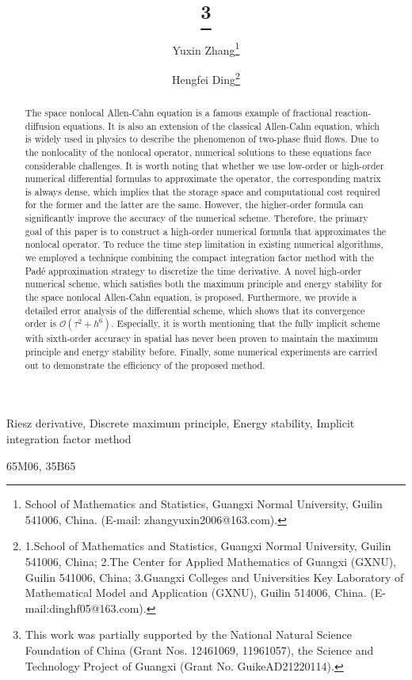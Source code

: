 \documentclass{siamart171218}
\title{{\TheTitle}\thanks{This work was partially supported by the
 National Natural Science Foundation of China
 (Grant Nos. 12461069, 11961057), the Science and
Technology Project of Guangxi (Grant No. GuikeAD21220114).}}
\author{
Yuxin Zhang\thanks{School of Mathematics and Statistics,
Guangxi Normal University, Guilin 541006, China. (E-mail: zhangyuxin2006@163.com).}
\and
Hengfei Ding\thanks{1.School of Mathematics and Statistics, Guangxi Normal University, Guilin 541006, China;
2.The Center for Applied
Mathematics of Guangxi (GXNU), Guilin 541006, China;
3.Guangxi Colleges and Universities Key Laboratory of Mathematical Model and Application (GXNU),
 Guilin 514006, China. (E-mail:dinghf05@163.com).}}
\numberwithin{theorem}{section}
\numberwithin{equation}{section}
\begin{document}
\maketitle
\begin{abstract}
 The space nonlocal Allen-Cahn equation is a famous example of fractional reaction-diffusion equations. It is also an extension of the classical Allen-Cahn equation, which is widely used in physics to describe the phenomenon of two-phase fluid flows.
 Due to the nonlocality of the nonlocal operator, numerical solutions to
 these equations face considerable challenges.
 It is worth noting that whether we use low-order or
 high-order numerical differential
  formulas to approximate the operator, the corresponding matrix is always
  dense, which implies that the storage space and computational cost
  required for the former and the latter are the same.
 However, the higher-order formula can significantly
  improve the accuracy of the numerical scheme.
   Therefore, the primary goal of this paper is to construct a high-order numerical formula that approximates the nonlocal operator.
  To reduce the time step limitation in existing numerical algorithms, we employed a technique combining the compact integration factor method with the Pad\'{e} approximation strategy to discretize the time derivative.
A novel high-order numerical scheme, which satisfies both the maximum principle and energy stability for the space nonlocal Allen-Cahn equation, is proposed.
Furthermore, we provide a detailed error analysis of the differential scheme, which shows that its convergence order is $\mathcal{O}\left(\tau^2+h^6\right)$.
 Especially, it is worth mentioning that the fully implicit scheme with sixth-order accuracy
 in spatial has never been proven to maintain the maximum principle and energy stability before.
Finally, some numerical experiments are carried out to demonstrate
 the efficiency of the proposed method.
\end{abstract}

\begin{keywords}
Riesz derivative, Discrete maximum principle,
 Energy stability, Implicit integration factor method
\end{keywords}

\begin{AMS}
65M06, 35B65
\end{AMS}
\end{document}
